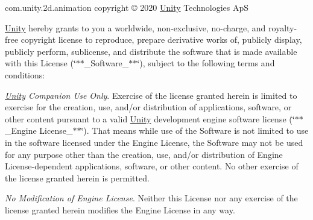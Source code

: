 com.\+unity.\+2d.\+animation copyright © 2020 \mbox{\hyperlink{namespace_unity}{Unity}} Technologies ApS

\mbox{\hyperlink{namespace_unity}{Unity}} hereby grants to you a worldwide, non-\/exclusive, no-\/charge, and royalty-\/free copyright license to reproduce, prepare derivative works of, publicly display, publicly perform, sublicense, and distribute the software that is made available with this License (\char`\"{}$\ast$$\ast$\+\_\+\+Software\+\_\+$\ast$$\ast$\char`\"{}), subject to the following terms and conditions\+:


\begin{DoxyEnumerate}
\item {\itshape \mbox{\hyperlink{namespace_unity}{Unity}} Companion Use Only}. Exercise of the license granted herein is limited to exercise for the creation, use, and/or distribution of applications, software, or other content pursuant to a valid \mbox{\hyperlink{namespace_unity}{Unity}} development engine software license (\char`\"{}$\ast$$\ast$\+\_\+\+Engine License\+\_\+$\ast$$\ast$\char`\"{}). That means while use of the Software is not limited to use in the software licensed under the Engine License, the Software may not be used for any purpose other than the creation, use, and/or distribution of Engine License-\/dependent applications, software, or other content. No other exercise of the license granted herein is permitted.
\end{DoxyEnumerate}
\begin{DoxyEnumerate}
\item {\itshape No Modification of Engine License}. Neither this License nor any exercise of the license granted herein modifies the Engine License in any way.
\end{DoxyEnumerate}
